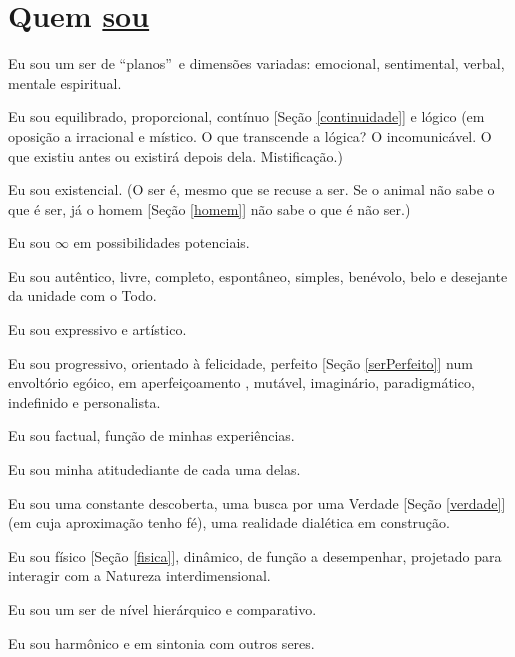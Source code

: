 \documentclass[12pt,a4paper]{article}
\begin{document}
	\section{Quem \href{http://sites.google.com/site/mathspirituality/portugues/EuSou.ASF?attredirects=0}{sou}}
		\begin{flushright}
		\end{flushright}

		Eu sou um ser de \textquotedblleft planos\textquotedblright\, e dimens\~oes variadas: emocional\footnotemark[1], sentimental, verbal\footnotemark[1], mental\footnotemark[1] e espiritual.

		Eu sou equilibrado, proporcional, cont\'inuo [Se\c{c}\~ao \ref{continuidade}] e l\'ogico \cite{logica} (em oposi\c{c}\~ao a irracional e m\'istico. O que transcende a l\'ogica? O incomunic\'avel. O que existiu antes ou existir\'a depois dela. Mistifica\c{c}\~ao.)

		Eu sou existencial. (O ser \'e, mesmo que se recuse a ser. Se o animal n\~ao sabe o que \'e ser, j\'a o homem [Se\c{c}\~ao \ref{homem}] n\~ao sabe o que \'e n\~ao ser.)

		Eu sou $ \infty $ em possibilidades \cite{possibilidades} potenciais.

		Eu sou aut\^entico, livre, completo, espont\^aneo, simples, ben\'evolo, belo e desejante da unidade \cite{unidade} com o Todo.

		Eu sou expressivo e art\'istico.

		Eu sou progressivo, orientado \`a felicidade, perfeito [Se\c{c}\~ao \ref{serPerfeito}] num envolt\'orio eg\'oico, em aperfei\c{c}oamento \cite{aperfeicoamento}, mut\'avel, imagin\'ario, paradigm\'atico, indefinido e personalista.

		Eu sou factual, fun\c{c}\~ao de minhas experi\^encias.

		Eu sou minha atitude\footnotemark[1] diante de cada uma delas.

		Eu sou uma constante descoberta, uma busca por uma Verdade [Se\c{c}\~ao \ref{verdade}] (em cuja aproxima\c{c}\~ao tenho f\'e\cite{feh}), uma realidade dial\'etica em constru\c{c}\~ao.

		Eu sou f\'isico [Se\c{c}\~ao \ref{fisica}], din\^amico, de fun\c{c}\~ao a desempenhar, projetado para interagir com a Natureza interdimensional.

		Eu sou um ser de n\'ivel hier\'arquico e comparativo.

		Eu sou harm\^onico e em sintonia com outros seres.
\end{document}
